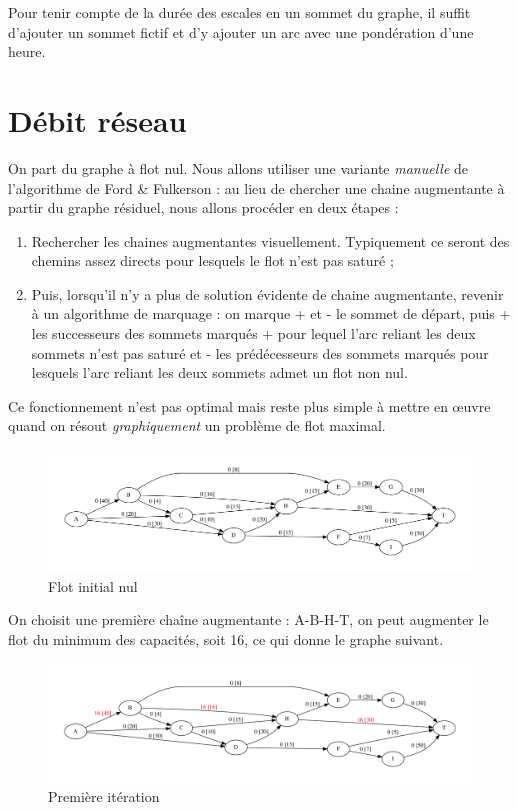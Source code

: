 \documentclass[paper=a4, fontsize=11pt]{scrartcl} %
\numberwithin{equation}{section} %
\numberwithin{figure}{section} %
\numberwithin{table}{section} %
\begin{document}
Pour tenir compte de la durée des escales en un sommet du graphe, il suffit d'ajouter un sommet fictif et d'y ajouter un arc avec une pondération d'une heure. 

\section{Débit réseau}

On part du graphe à flot nul. Nous allons utiliser une variante \emph{manuelle} de l'algorithme de Ford \& Fulkerson : au lieu de chercher une chaine augmentante à partir du graphe résiduel, nous allons procéder en deux étapes :
\begin{enumerate}
  \item Rechercher les chaines augmentantes visuellement. Typiquement ce seront des chemins assez directs pour lesquels le flot n'est pas saturé ;
  \item Puis, lorsqu'il n'y a plus de solution évidente de chaine augmentante, revenir à un algorithme de marquage : on marque + et - le sommet de départ, puis + les successeurs des sommets marqués + pour lequel l'arc reliant les deux sommets n'est pas saturé et - les prédécesseurs des sommets marqués pour lesquels l'arc reliant les deux sommets admet un flot non nul.
\end{enumerate}

Ce fonctionnement n'est pas optimal mais reste plus simple à mettre en \oe uvre quand on résout \emph{graphiquement} un problème de flot maximal.

\begin{figure}[h]
\begin{center}
	\includegraphics[width=\textwidth]{figs/reseau.pdf}
	\caption{Flot initial nul}
	\label{fig:res:0}
\end{center}
\end{figure}

On choisit une première chaîne augmentante : A-B-H-T, on peut augmenter le flot du minimum des capacités, soit 16, ce qui donne le graphe suivant.

\begin{figure}[h]
\begin{center}
	\includegraphics[width=\textwidth]{figs/reseau-1.pdf}
	\caption{Première itération}
	\label{fig:res:1}
\end{center}
\end{figure}
\end{document}
